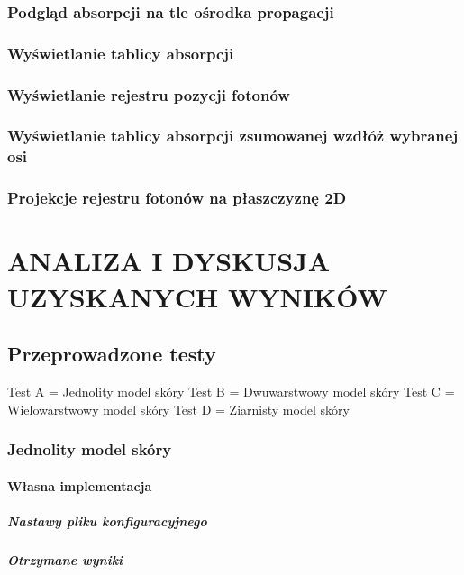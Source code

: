 \subsection{Podgląd absorpcji na tle ośrodka propagacji}
\subsection{Wyświetlanie tablicy absorpcji}
\subsection{Wyświetlanie rejestru pozycji fotonów}
\subsection{Wyświetlanie tablicy absorpcji zsumowanej wzdłóż wybranej osi}
\subsection{Projekcje rejestru fotonów na płaszczyznę 2D}



\chapter{ANALIZA I DYSKUSJA UZYSKANYCH WYNIKÓW}
\label{chpt:analiza-i-dyskusja-uzyskanych-wyników}

\section{Przeprowadzone testy}

Test A = Jednolity model skóry
Test B = Dwuwarstwowy model skóry
Test C = Wielowarstwowy model skóry
Test D = Ziarnisty model skóry

\subsection{Jednolity model skóry}
\subsubsection{Własna implementacja}
\paragraph{Nastawy pliku konfiguracyjnego}
\paragraph{Otrzymane wyniki}
